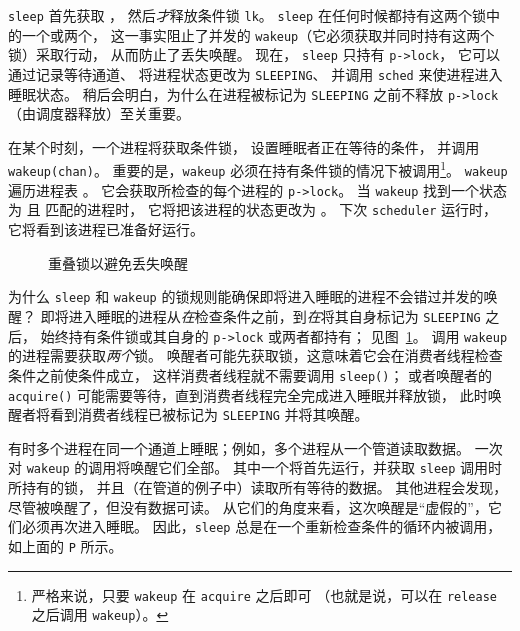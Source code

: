 \lstinline{sleep}
首先获取
，
然后{\it 才}释放条件锁
\lstinline{lk}。
\lstinline{sleep}
在任何时候都持有这两个锁中的一个或两个，
这一事实阻止了并发的 \lstinline{wakeup}（它必须获取并同时持有这两个锁）采取行动，
从而防止了丢失唤醒。
现在，
\lstinline{sleep}
只持有
\lstinline{p->lock}，
它可以通过记录等待通道、
将进程状态更改为 \texttt{SLEEPING}、
并调用
\lstinline{sched}
来使进程进入睡眠状态。
稍后会明白，为什么在进程被标记为 \texttt{SLEEPING} 之前不释放 \lstinline{p->lock}（由调度器释放）至关重要。

在某个时刻，一个进程将获取条件锁，
设置睡眠者正在等待的条件，
并调用 \lstinline{wakeup(chan)}。
重要的是，\lstinline{wakeup} 必须在持有条件锁的情况下被调用\footnote{%
%
严格来说，只要 \lstinline{wakeup} 在 \lstinline{acquire} 之后即可
（也就是说，可以在 \lstinline{release} 之后调用 \lstinline{wakeup}）。%
%
}。
\lstinline{wakeup}
遍历进程表
。
它会获取所检查的每个进程的 \lstinline{p->lock}。
当 \lstinline{wakeup} 找到一个状态为
 且
 匹配的进程时，
它将把该进程的状态更改为
。
下次 \lstinline{scheduler} 运行时，
它将看到该进程已准备好运行。

\begin{figure}[t]
  
  \caption{重叠锁以避免丢失唤醒}
    \label{fig:overlap}
\end{figure}

为什么 \lstinline{sleep} 和 \lstinline{wakeup} 的锁规则能确保即将进入睡眠的进程不会错过并发的唤醒？
即将进入睡眠的进程从{\it 在}检查条件之前，到{\it 在}将其自身标记为 \texttt{SLEEPING} 之后，
始终持有条件锁或其自身的 \lstinline{p->lock} 或两者都持有；
见图~\ref{fig:overlap}。
调用 \texttt{wakeup} 的进程需要获取{\it 两个}锁。
唤醒者可能先获取锁，这意味着它会在消费者线程检查条件之前使条件成立，
这样消费者线程就不需要调用 {\tt sleep()}；
或者唤醒者的 {\tt acquire()} 可能需要等待，直到消费者线程完全完成进入睡眠并释放锁，
此时唤醒者将看到消费者线程已被标记为 {\tt SLEEPING} 并将其唤醒。

有时多个进程在同一个通道上睡眠；例如，多个进程从一个管道读取数据。
一次对 \lstinline{wakeup} 的调用将唤醒它们全部。
其中一个将首先运行，并获取 \lstinline{sleep} 调用时所持有的锁，
并且（在管道的例子中）读取所有等待的数据。
其他进程会发现，尽管被唤醒了，但没有数据可读。
从它们的角度来看，这次唤醒是“虚假的”，它们必须再次进入睡眠。
因此，\lstinline{sleep} 总是在一个重新检查条件的循环内被调用，如上面的 \lstinline{P} 所示。


